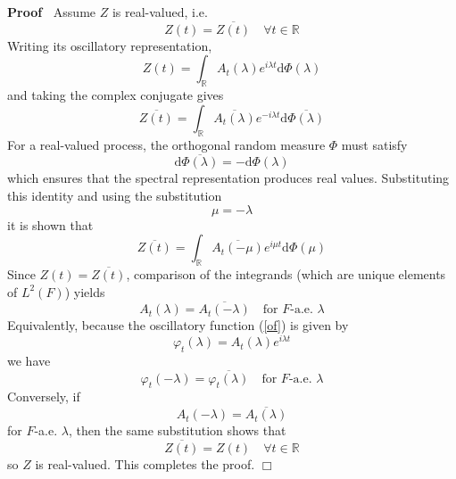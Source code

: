 \documentclass{article}
\newcommand{\mathd}{\mathrm{d}}
\newenvironment{proof}{\noindent\textbf{Proof\ }}{\hspace*{\fill}$\Box$\medskip}
\begin{document}
\begin{proof}
  Assume $Z$ is real-valued, i.e.
  \begin{equation}
    Z (t) = \overline{Z (t)} \quad \forall t \in \mathbb{R}
  \end{equation}
  Writing its oscillatory representation,
  \begin{equation}
    Z (t) = \int_{\mathbb{R}} A_t (\lambda) e^{i \lambda t} \mathd \Phi
    (\lambda)
  \end{equation}
  and taking the complex conjugate gives
  \begin{equation}
    \overline{Z (t)} = \int_{\mathbb{R}} \overline{A_t (\lambda)} e^{- i
    \lambda t} \mathd \overline{\Phi (\lambda)}
  \end{equation}
  For a real-valued process, the orthogonal random measure $\Phi$ must satisfy
  \begin{equation}
    \mathd \overline{\Phi (\lambda)} = - \mathd \Phi (\lambda)
  \end{equation}
  which ensures that the spectral representation produces real values.
  Substituting this identity and using the substitution
  \begin{equation}
    \mu = - \lambda
  \end{equation}
  it is shown that
  \begin{equation}
    \overline{Z (t)} = \int_{\mathbb{R}} \overline{A_t  (- \mu)} e^{i \mu t}
    \mathd \Phi (\mu)
  \end{equation}
  Since $Z (t) = \overline{Z (t)}$, comparison of the integrands (which are
  unique elements of $L^2 (F)$) yields
  \begin{equation}
    A_t (\lambda) = \overline{A_t  (- \lambda)} \quad \text{for } F
    \text{-a.e. } \lambda
  \end{equation}
  Equivalently, because the oscillatory function (\ref{of}) is given by
  \begin{equation}
    \varphi_t (\lambda) = A_t (\lambda) e^{i \lambda t}
  \end{equation}
  we have
  \begin{equation}
    \varphi_t  (- \lambda) = \overline{\varphi_t (\lambda)} \quad \text{for }
    F \text{-a.e. } \lambda
  \end{equation}
  Conversely, if
  \begin{equation}
    A_t  (- \lambda) = \overline{A_t (\lambda)}
  \end{equation}
  for $F$-a.e. $\lambda$, then the same substitution shows that
  \begin{equation}
    \overline{Z (t)} = Z (t) \quad \forall t \in \mathbb{R}
  \end{equation}
  so $Z$ is real-valued. This completes the proof.
\end{proof}
\end{document}
